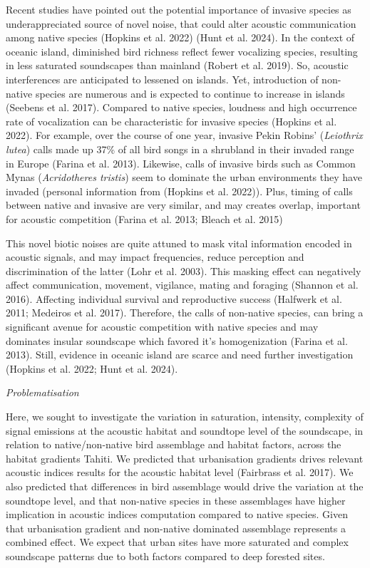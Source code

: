 \documentclass[
  french,
  11pt,
]{stylisharticle}
\begin{document}
Recent studies have pointed out the potential importance of invasive
species as underappreciated source of novel noise, that could alter
acoustic communication among native species (Hopkins et al. 2022) (Hunt
et al. 2024). In the context of oceanic island, diminished bird richness
reflect fewer vocalizing species, resulting in less saturated
soundscapes than mainland (Robert et al. 2019). So, acoustic
interferences are anticipated to lessened on islands. Yet, introduction
of non-native species are numerous and is expected to continue to
increase in islands (Seebens et al. 2017). Compared to native species,
loudness and high occurrence rate of vocalization can be characteristic
for invasive species (Hopkins et al. 2022). For example, over the course
of one year, invasive Pekin Robins' (\emph{Leiothrix lutea}) calls made
up 37\% of all bird songs in a shrubland in their invaded range in
Europe (Farina et al. 2013). Likewise, calls of invasive birds such as
Common Mynas (\emph{Acridotheres tristis}) seem to dominate the urban
environments they have invaded (personal information from (Hopkins et
al. 2022)). Plus, timing of calls between native and invasive are very
similar, and may creates overlap, important for acoustic competition
(Farina et al. 2013; Bleach et al. 2015)

This novel biotic noises are quite attuned to mask vital information
encoded in acoustic signals, and may impact frequencies, reduce
perception and discrimination of the latter (Lohr et al. 2003). This
masking effect can negatively affect communication, movement, vigilance,
mating and foraging (Shannon et al. 2016). Affecting individual survival
and reproductive success (Halfwerk et al. 2011; Medeiros et al. 2017).
Therefore, the calls of non-native species, can bring a significant
avenue for acoustic competition with native species and may dominates
insular soundscape which favored it's homogenization (Farina et al.
2013). Still, evidence in oceanic island are scarce and need further
investigation (Hopkins et al. 2022; Hunt et al. 2024).

\emph{Problematisation}

Here, we sought to investigate the variation in saturation, intensity,
complexity of signal emissions at the acoustic habitat and soundtope
level of the soundscape, in relation to native/non-native bird
assemblage and habitat factors, across the habitat gradients Tahiti. We
predicted that urbanisation gradients drives relevant acoustic indices
results for the acoustic habitat level (Fairbrass et al. 2017). We also
predicted that differences in bird assemblage would drive the variation
at the soundtope level, and that non-native species in these assemblages
have higher implication in acoustic indices computation compared to
native species. Given that urbanisation gradient and non-native
dominated assemblage represents a combined effect. We expect that urban
sites have more saturated and complex soundscape patterns due to both
factors compared to deep forested sites.
\end{document}
